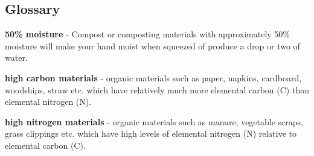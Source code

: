 \subsection{Glossary}\label{glossary}

\textbf{50\% moisture} - Compost or composting materials with
approximately 50\% moisture will make your hand moist when squeezed of
produce a drop or two of water.

\textbf{high carbon materials} - organic materials such as paper,
napkins, cardboard, woodships, straw etc. which have relatively much
more elemental carbon (C) than elemental nitrogen (N).

\textbf{high nitrogen materials} - organic materials such as manure,
vegetable scraps, grass clippings etc. which have high levels of
elemental nitrogen (N) relative to elemental carbon (C).
